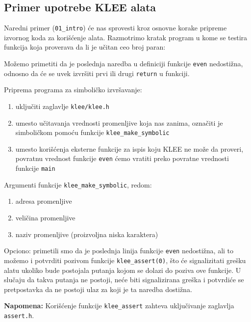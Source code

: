 \subsection{Primer upotrebe KLEE alata}\label{primer-upotrebe-klee-alata}

Naredni primer (\texttt{01\_intro}) će nas sprovesti kroz osnovne korake pripreme izvornog koda za korišćenje alata. Razmotrimo kratak program u kome se testira funkcija koja proverava da li je učitan ceo broj paran:


Možemo primetiti da je poslednja naredba u definiciji funkcije \texttt{even} nedostižna, odnosno da će se uvek izvršiti prvi ili drugi \texttt{return} u funkciji.

Priprema programa za simboličko izvršavanje:

\begin{enumerate}
\def\labelenumi{\arabic{enumi}.}
\tightlist
\item
  uključiti zaglavlje \texttt{klee/klee.h}
\item
  umesto učitavanja vrednosti promenljive koja nas zanima, označiti je simboličkom pomoću funkcije \texttt{klee\_make\_symbolic}
\item
  umesto korišćenja eksterne funkcije za ispis koju KLEE ne može da proveri, povratnu vrednost funkcije \texttt{even} ćemo vratiti preko povratne vrednosti funkcije \texttt{main}
\end{enumerate}

Argumenti funkcije \texttt{klee\_make\_symbolic}, redom:

\begin{enumerate}
\def\labelenumi{\arabic{enumi}.}
\tightlist
\item
  adresa promenljive
\item
  veličina promenljive
\item
  naziv promenljive (proizvoljna niska karaktera)
\end{enumerate}

Opciono: primetili smo da je poslednja linija funkcije \texttt{even} nedostižna, ali to možemo i potvrditi pozivom funkcije \texttt{klee\_assert(0)}, što će signalizitati grešku alatu ukoliko bude postojala putanja kojom se dolazi do poziva ove funkcije. U slučaju da takva putanja ne postoji, neće biti signalizirana greška i potvrdiće se pretpostavka da ne postoji ulaz za koji je ta naredba dostižna.

\textbf{Napomena:} Korišćenje funkcije \texttt{klee\_assert} zahteva uključivanje zaglavlja \texttt{assert.h}.

